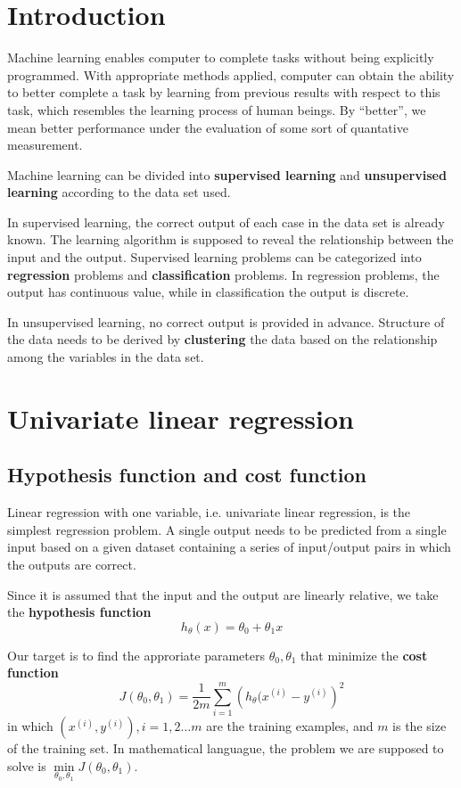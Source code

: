 \ifx\PREAMBLE\undefined


\fi
\section{Introduction}
Machine learning enables computer to complete tasks without being explicitly programmed. With appropriate methods applied, computer can obtain the ability to better complete a task by learning from previous results with respect to this task, which resembles the learning process of human beings. By ``better'', we mean better performance under the evaluation of some sort of quantative measurement.

Machine learning can be divided into {\bf supervised learning} and {\bf unsupervised learning} according to the data set used. 

In supervised learning, the correct output of each case in the data set is already known. The learning algorithm is supposed to reveal the relationship between the input and the output. Supervised learning problems can be categorized into {\bf regression} problems and {\bf classification} problems. In regression problems, the output has continuous value, while in classification the output is discrete.

In unsupervised learning, no correct output is provided in advance. Structure of the data needs to be derived by {\bf clustering} the data based on the relationship among the variables in the data set.

\section{Univariate linear regression}
\subsection{Hypothesis function and cost function}
Linear regression with one variable, i.e. univariate linear regression, is the simplest regression problem. A single output needs to be predicted from a single input based on a given dataset containing a series of input/output pairs in which the outputs are correct.

Since it is assumed that the input and the output are linearly relative, we take the {\bf hypothesis function}
\begin{equation}
h_{\theta}(x) = \theta_0 + \theta_1x
\end{equation}

Our target is to find the approriate parameters $\theta_0, \theta_1$ that minimize the {\bf cost function}
\begin{equation}
J(\theta_0, \theta_1) = \frac{1}{2m}\sum\limits_{i=1}^m\left(h_{\theta}(x^{(i)}-y^{(i)}\right)^2
\end{equation}
in which $\left(x^{(i)},y^{(i)}\right), i = 1, 2 \dots m$ are the training examples, and $m$ is the size of the training set. In mathematical languague, the problem we are supposed to solve is $\min\limits_{\theta_0, \theta_1}J\left(\theta_0, \theta_1\right)$.
